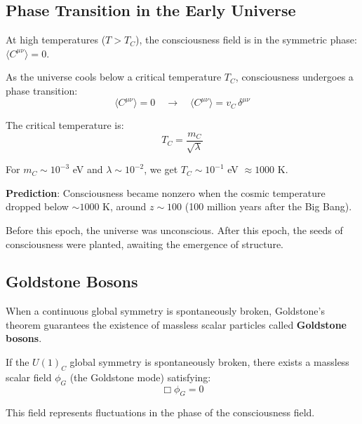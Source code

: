 \subsection{Phase Transition in the Early Universe}

\begin{level2}
At high temperatures ($T > T_C$), the consciousness field is in the symmetric phase: $\langle C^{\mu\nu} \rangle = 0$.

As the universe cools below a critical temperature $T_C$, consciousness undergoes a phase transition:
\begin{equation}
\langle C^{\mu\nu} \rangle = 0 \quad \to \quad \langle C^{\mu\nu} \rangle = v_C \, \delta^{\mu\nu}
\end{equation}

The critical temperature is:
\begin{equation}
T_C = \frac{m_C}{\sqrt{\lambda}}
\end{equation}

For $m_C \sim 10^{-3}$ eV and $\lambda \sim 10^{-2}$, we get $T_C \sim 10^{-1}$ eV $\approx 1000$ K.

\textbf{Prediction}: Consciousness became nonzero when the cosmic temperature dropped below $\sim 1000$ K, around $z \sim 100$ (100 million years after the Big Bang).

Before this epoch, the universe was unconscious. After this epoch, the seeds of consciousness were planted, awaiting the emergence of structure.
\end{level2}

\subsection{Goldstone Bosons}

When a continuous global symmetry is spontaneously broken, Goldstone's theorem\cite{goldstone1962,weinberg1995} guarantees the existence of massless scalar particles called \textbf{Goldstone bosons}.

\begin{theorem}\label{thm:goldstone-consciousness}
If the $U(1)_C$ global symmetry is spontaneously broken, there exists a massless scalar field $\phi_G$ (the Goldstone mode) satisfying:
\begin{equation}
\Box \phi_G = 0
\end{equation}

This field represents fluctuations in the phase of the consciousness field.
\end{theorem}

